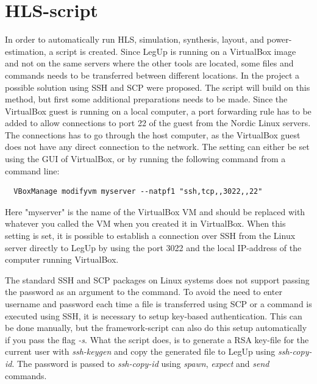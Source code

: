 \section{\label{sec:hlsscript}HLS-script}
In order to automatically run HLS, simulation, synthesis, layout, and power-estimation, a script is created. Since LegUp is running on a VirtualBox image and not on the same servers where the other tools are located, some files and commands needs to be transferred between different locations. In the project \cite{holm2015pro} a possible solution using SSH and SCP were proposed. The script will build on this method, but first some additional preparations needs to be made. Since the VirtualBox guest is running on a local computer, a port forwarding rule has to be added to allow connections to port 22 of the guest from the Nordic Linux servers. The connections has to go through the host computer, as the VirtualBox guest does not have any direct connection to the network. The setting can either be set using the GUI of VirtualBox, or by running the following command from a command line:
\begin{verbatim}
  VBoxManage modifyvm myserver --natpf1 "ssh,tcp,,3022,,22"  
\end{verbatim}
Here "myserver" is the name of the VirtualBox VM and should be replaced with whatever you called the VM when you created it in VirtualBox. When this setting is set, it is possible to establish a connection over SSH from the Linux server directly to LegUp by using the port 3022 and the local IP-address of the computer running VirtualBox.

The standard SSH and SCP packages on Linux systems does not support passing the password as an argument to the command. To avoid the need to enter username and password each time a file is transferred using SCP or a command is executed using SSH, it is necessary to setup key-based authentication. This can be done manually, but the framework-script can also do this setup automatically if you pass the flag \textit{-s}. What the script does, is to generate a RSA key-file for the current user with \textit{ssh-keygen} and copy the generated file to LegUp using \textit{ssh-copy-id}. The password is passed to \textit{ssh-copy-id} using \textit{spawn}, \textit{expect} and \textit{send} commands.

